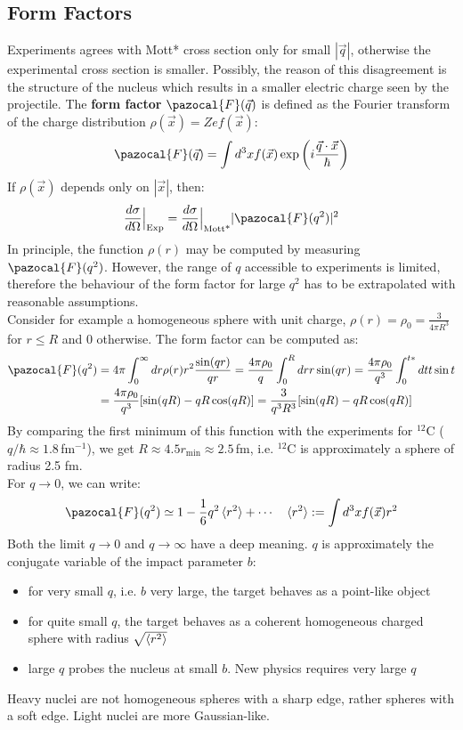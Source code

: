 \documentclass[10.75pt,a4paper,openright,bottom=2cm]{article}
\begin{document}
\subsection{Form Factors}
Experiments agrees with Mott* cross section only for small $|\Vec{q}|$, otherwise the experimental cross section is smaller. Possibly, the reason of this disagreement is the structure of the nucleus which results in a smaller electric charge seen by the projectile. The \textbf{form factor} $\pazocal{F}(\Vec{q})$ is defined as the Fourier transform of the charge distribution $\rho(\Vec{x})=Zef(\Vec{x})$:
\[
\pazocal{F}(\Vec{q})=\int d^3xf(\Vec{x})\exp\left(i\frac{\Vec{q}\cdot\Vec{x}}{\hbar}\right)
\]
If $\rho(\Vec{x})$ depends only on $|\Vec{x}|$, then:
\[
\frac{d\sigma}{d\Omega}\Bigr|_{\substack{\text{Exp}}}=\frac{d\sigma}{d\Omega}\Bigr|_{\substack{\text{Mott*}}}|\pazocal{F}(q^2)|^2
\]
In principle, the function $\rho(r)$ may be computed by measuring $\pazocal{F}(q^2)$. However, the range of $q$ accessible to experiments is limited, therefore the behaviour of the form factor for large $q^2$ has to be extrapolated with reasonable assumptions.\\
Consider for example a homogeneous sphere with unit charge, $\rho(r)=\rho_0=\frac{3}{4\pi R^3}$ for $r\le R$ and 0 otherwise. The form factor can be computed as:
\begin{align*}
\pazocal{F}(q^2)&=4\pi\int_0^\infty dr\rho(r)r^2\frac{\sin(qr)}{qr}=\frac{4\pi\rho_0}{q}\int_0^Rdrr\sin(qr)=\frac{4\pi\rho_0}{q^3}\int_0^{t*}dtt\sin t\\
&=\frac{4\pi\rho_0}{q^3}[\sin(qR)-qR\cos(qR)]=\frac{3}{q^3R^3}[\sin(qR)-qR\cos(qR)]
\end{align*}
By comparing the first minimum of this function with the experiments for $^{12}$C ($q/\hbar\approx1.8$\,fm$^{-1}$), we get $R\approx4.5 r_{\min}\approx2.5$\,fm, i.e. $^{12}$C is approximately a sphere of radius 2.5 fm.\\
For $q\to0$, we can write:
\[
\pazocal{F}(q^2)\simeq1-\frac{1}{6}q^2\braket{r^2}+\cdots \quad \braket{r^2}:=\int d^3xf(\Vec{x})r^2
\]
Both the limit $q\to0$ and $q\to\infty$ have a deep meaning. $q$ is approximately the conjugate variable of the impact parameter $b$:
\begin{itemize}
    \item for very small $q$, i.e. $b$ very large, the target behaves as a point-like object
    \item for quite small $q$, the target behaves as a coherent homogeneous charged sphere with radius $\sqrt{\braket{r^2}}$
    \item large $q$ probes the nucleus at small $b$. New physics requires very large $q$
\end{itemize}
Heavy nuclei are not homogeneous spheres with a sharp edge, rather spheres with a soft edge. Light nuclei are more Gaussian-like.
\end{document}

